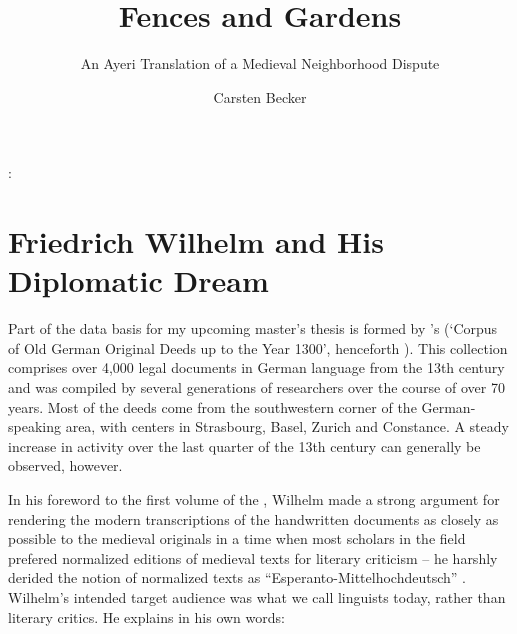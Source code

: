 \documentclass[12pt,paper=a4]{scrartcl}
\author{Carsten Becker}
\title{Fences and Gardens}
\subtitle{An Ayeri Translation of a Medieval Neighborhood Dispute}
\newenvironment{mytitle}{
    \hfill
    \begin{minipage}{0.667\textwidth}
	\vspace{\baselineskip}
	\begin{center}
	    \Large
	    \sffamily\bfseries
	    \makeatletter
}{
	    \makeatother
	\end{center}
	\vspace{1em}
    \end{minipage}
    \hfill
}
\begin{document}

\begin{mytitle}
    \@title: \@subtitle
\end{mytitle}

\section{Friedrich Wilhelm and His Diplomatic Dream}
Part of the data basis for my upcoming master's thesis is formed 
by \citeauthor{CAO}'s  (\enquote*{Corpus of Old German Original 
Deeds up to the Year 1300}, henceforth ). This collection 
comprises over 4,000 legal documents in German language from the 13th century 
and was compiled by several generations of researchers over the course of over 
70 years. Most of the deeds come from the southwestern corner of the 
German-speaking area, with centers in Strasbourg, Basel, Zurich and Constance. A 
steady increase in activity over the last quarter of the 13th century can 
generally be observed, however.

In his foreword to the first volume of the , Wilhelm made a 
strong argument for rendering the modern transcriptions of the handwritten 
documents as closely as possible to the medieval originals in a time when most 
scholars in the field prefered normalized editions of medieval texts for 
literary criticism – he harshly derided the notion of normalized texts as 
\enquote{Esperanto-Mittelhochdeutsch} \autocite[see][VIII--IX]{CAO1}. Wilhelm's 
intended target audience was what we call linguists today, rather than literary 
critics. He explains in his own words:
\end{document}
